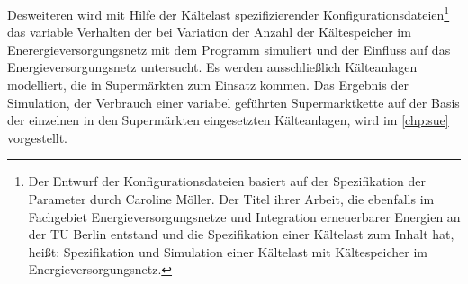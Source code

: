 Desweiteren wird mit Hilfe der K\"altelast spezifizierender
Konfigurationsdateien\footnote{ Der Entwurf der Konfigurationsdateien basiert
auf der Spezifikation der Parameter durch Caroline M\"oller. Der Titel ihrer
Arbeit, die ebenfalls im Fachgebiet Energieversorgungsnetze und Integration
erneuerbarer Energien an der TU Berlin entstand und die Spezifikation einer
K\"altelast zum Inhalt hat, heißt: Spezifikation und Simulation einer Kältelast
mit Kältespeicher im Energieversorgungsnetz.} das variable Verhalten der bei
Variation der Anzahl der K\"altespeicher im Enerergieversorgungsnetz mit dem
Programm simuliert und der Einfluss auf das Energieversorgungsnetz untersucht.
Es werden ausschlie\ss lich K\"alteanlagen modelliert, die in
Superm\"arkten zum Einsatz kommen. Das Ergebnis der Simulation, der
Verbrauch einer variabel gef\"uhrten Supermarktkette auf der Basis der einzelnen
in den Superm\"arkten eingesetzten K\"alteanlagen, wird im \cref{chp:sue}
vorgestellt.

